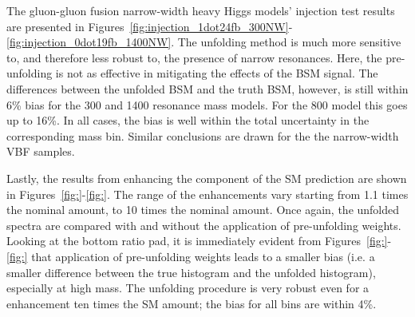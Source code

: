 The gluon-gluon fusion narrow-width heavy Higgs models' injection test results are presented in Figures~\ref{fig:injection_1dot24fb_300NW}-\ref{fig:injection_0dot19fb_1400NW}. The unfolding method is much more sensitive to, and therefore less robust to, the presence of narrow resonances. Here, the pre-unfolding is not as effective in mitigating the effects of the BSM signal. The differences between the unfolded BSM and the truth BSM, however, is still within 6\% bias for the \unit{300}{\GeV} and \unit{1400}{\GeV} resonance mass models. For the \unit{800}{\GeV} model this goes up to 16\%. In all cases, the bias is well within the total uncertainty in the corresponding \mFourL{} mass bin. Similar conclusions are drawn for the the narrow-width VBF samples. 

Lastly, the results from enhancing the \ggZZ component of the SM prediction are shown in Figures~\ref{fig:}-\ref{fig:}. The range of the enhancements vary starting from 1.1 times the nominal amount, to 10 times the nominal amount. Once again, the unfolded spectra are compared with and without the application of pre-unfolding weights. Looking at the bottom ratio pad, it is immediately evident from Figures~\ref{fig:}-\ref{fig:} that application of pre-unfolding weights leads to a smaller bias (i.e. a smaller difference between the true histogram and the unfolded histogram), especially at high mass. The unfolding procedure is very robust even for a \ggZZ enhancement ten times the SM amount; the bias for all bins are within 4\%.

